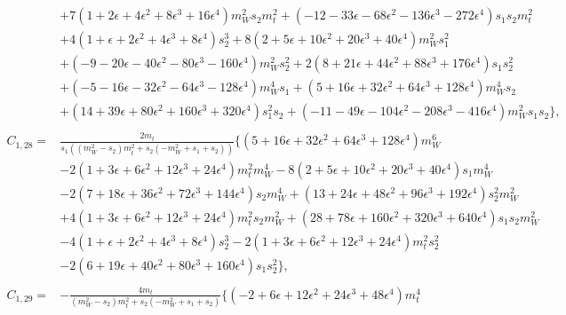 \documentclass[twocolumn,aps,showpacs,nofootinbib,superscriptaddress,prd]{revtex4-2}
\begin{document}
\begin{widetext}
\begin{align}
\nonumber\\&
+7\left(1 +2 \epsilon +4 \epsilon^2 +8 \epsilon^3 +16 \epsilon^4\right)m_W^2s_2m_t^2+\left(-12 -33 \epsilon -68 \epsilon^2 -136 \epsilon^3 -272 \epsilon^4\right)s_1s_2m_t^2
\nonumber\\&
+4\left(1 +\epsilon +2 \epsilon^2 +4 \epsilon^3 +8 \epsilon^4\right)s_2^3+8\left(2 +5 \epsilon +10 \epsilon^2 +20 \epsilon^3 +40 \epsilon^4\right)m_W^2s_1^2
\nonumber\\&
+\left(-9 -20 \epsilon -40 \epsilon^2 -80 \epsilon^3 -160 \epsilon^4\right)m_W^2s_2^2+2\left(8 +21\epsilon +44 \epsilon^2 +88 \epsilon^3 +176 \epsilon^4\right)s_1s_2^2
\nonumber\\&
+\left(-5 -16 \epsilon -32 \epsilon^2 -64 \epsilon^3 -128 \epsilon^4\right)m_W^4s_1+\left(5 +16 \epsilon +32 \epsilon^2 +64 \epsilon^3 +128 \epsilon^4\right)m_W^4s_2
\nonumber\\&
+\left(14 +39 \epsilon +80 \epsilon^2 +160 \epsilon^3 +320 \epsilon^4\right)s_1^2s_2+\left(-11 -49 \epsilon -104 \epsilon^2 -208 \epsilon^3 -416 \epsilon^4\right)m_W^2s_1s_2\}
,\nonumber\\
\nonumber\\
C_{1,28}=&\frac{2m_t}{s_1\left(\left(m_W^2-s_2\right)m_t^2+s_2\left(-m_W^2+s_1+s_2\right)\right)}\{\left(5 +16 \epsilon +32 \epsilon^2 +64 \epsilon^3 +128 \epsilon^4\right)m_W^6
\nonumber\\&
-2\left(1 +3 \epsilon +6 \epsilon^2 +12 \epsilon^3 +24 \epsilon^4\right)m_t^2m_W^4-8\left(2 +5 \epsilon +10 \epsilon^2 +20 \epsilon^3 +40 \epsilon^4\right)s_1m_W^4
\nonumber\\&
-2\left(7 +18 \epsilon +36 \epsilon^2 +72 \epsilon^3 +144 \epsilon^4\right)s_2m_W^4+\left(13 +24 \epsilon +48 \epsilon^2 +96 \epsilon^3 +192 \epsilon^4\right)s_2^2m_W^2
\nonumber\\&
+4\left(1 +3 \epsilon +6 \epsilon^2 +12 \epsilon^3 +24 \epsilon^4\right)m_t^2s_2m_W^2+\left(28 +78 \epsilon +160 \epsilon^2 +320 \epsilon^3 +640 \epsilon^4\right)s_1s_2m_W^2
\nonumber\\&
-4\left(1 +\epsilon +2 \epsilon^2 +4 \epsilon^3 +8 \epsilon^4\right)s_2^3-2\left(1 +3 \epsilon +6 \epsilon^2 +12 \epsilon^3 +24 \epsilon^4\right)m_t^2s_2^2
\nonumber\\&
-2\left(6 +19 \epsilon +40 \epsilon^2 +80 \epsilon^3 +160 \epsilon^4\right)s_1s_2^2\}
,\nonumber\\
\nonumber\\
C_{1,29}=&-\frac{4m_t}{\left(m_W^2-s_2\right)m_t^2+s_2\left(-m_W^2+s_1+s_2\right)}\{\left(-2 +6 \epsilon +12 \epsilon^2 +24 \epsilon^3 +48 \epsilon^4\right)m_t^4

\end{align}
\end{widetext}
\end{document}
